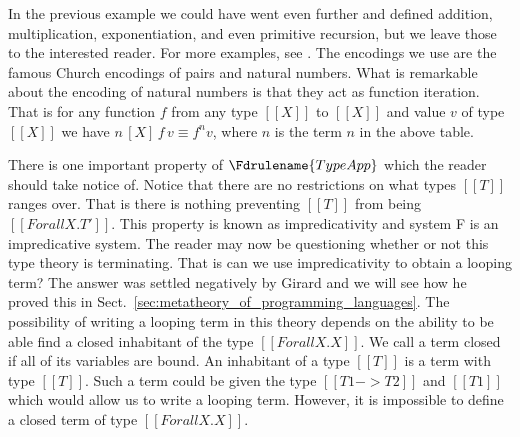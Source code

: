 In the previous example we could have went even further and defined
addition, multiplication, exponentiation, and even primitive
recursion, but we leave those to the interested reader.  For more
examples, see \cite{Girard:1989}.  The encodings we use are the famous
Church encodings of pairs and natural numbers.  What is remarkable
about the encoding of natural numbers is that they act as function
iteration.  That is for any function $f$ from any type $[[X]]$ to
$[[X]]$ and value $v$ of type $[[X]]$ we have $n\,[X]\,f\,v \equiv f^n
v$, where $n$ is the term $n$ in the above table.

There is one important property of $\Fdrulename{TypeApp}$ which the
reader should take notice of.  Notice that there are no restrictions
on what types $[[T]]$ ranges over.  That is there is nothing
preventing $[[T]]$ from being $[[Forall X.T']]$.  This property is
known as impredicativity and system F is an impredicative system.  The
reader may now be questioning whether or not this type theory is
terminating.  That is can we use impredicativity to obtain a looping
term?  The answer was settled negatively by Girard and we will see how
he proved this in Sect.~\ref{sec:metatheory_of_programming_languages}.
The possibility of writing a looping term in this theory depends on the
ability to be able find a closed inhabitant of the type 
$[[Forall X.X]]$.  We call a term closed if all of its variables are bound.
An inhabitant of a type $[[T]]$ is a term with type $[[T]]$.  Such a
term could be given the type $[[T1 -> T2]]$ and $[[T1]]$ which would
allow us to write a looping term.  However, it is impossible to define
a closed term of type $[[Forall X.X]]$.

